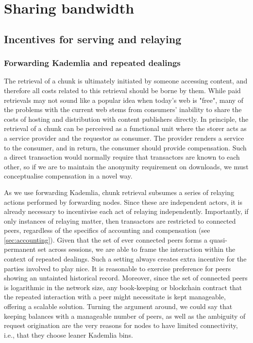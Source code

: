 \section{Sharing bandwidth\statusgreen}

\green{}

\subsection{Incentives for serving and relaying\statusgreen}\label{sec:incentives-relaying}

\green{}

\subsubsection{Forwarding Kademlia and repeated dealings}

The retrieval of a chunk is ultimately initiated by someone accessing content, and therefore all costs related to this retrieval should be borne by them. While paid retrievals may not sound like a popular idea when today's web is "free", many of the problems with the current web stems from consumers' inability to share the costs of hosting and distribution with content publishers directly. In principle, the retrieval of a chunk can be perceived as a functional unit where the storer acts as a service provider and the requestor as consumer. The provider renders a service to the consumer, and in return, the consumer should provide compensation. Such a direct transaction would normally require that transactors are known to each other, so if we are to maintain the anonymity requirement on downloads, we must conceptualise compensation in a novel way. 

As we use forwarding Kademlia, chunk retrieval subsumes a series of relaying actions performed by forwarding nodes. Since these are independent actors, it is already necessary to incentivise each act of relaying independently. Importantly, if only instances of relaying matter, then transactors are restricted to connected peers, regardless of the specifics of accounting and compensation (see \ref{sec:accounting}). Given that the set of ever connected peers forms a quasi-permanent set across sessions, we are able to frame the interaction within the context of repeated dealings. Such a setting always creates extra incentive for the parties involved to play nice. It is reasonable to exercise preference for peers showing an untainted historical record. Moreover, since the set of connected peers is logarithmic in the network size, any book-keeping or blockchain contract that the repeated interaction with a peer might necessitate is kept manageable, offering a scalable solution. Turning the argument around, we could say that keeping balances with a manageable number of peers, as well as the ambiguity of request origination are the very reasons for nodes to have limited connectivity, i.e., that they choose leaner Kademlia bins.

